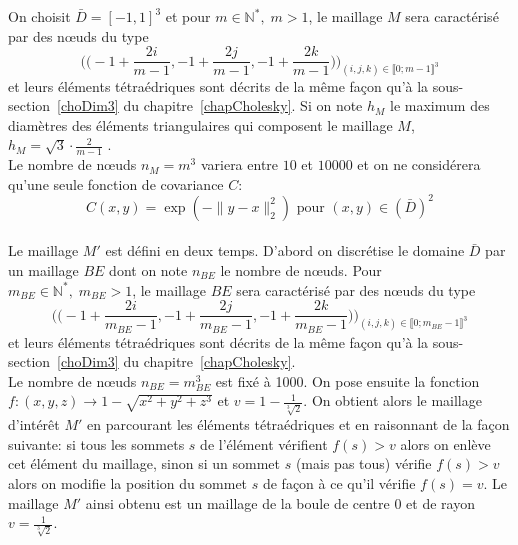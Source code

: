 On choisit $\bar{D}= [-1,1]^3$ et pour $m \in \mathbb{N}^{*}, \; m > 1$, le maillage $M$ sera caractérisé par des n\oe uds du type
\begin{equation*} \biggl (\biggl(-1 + \frac{2i}{m-1}, -1 + \frac{2j}{m-1}, -1 + \frac{2k}{m-1}\biggr)\biggr)_{(i,j,k) \in \llbracket 0;m-1 \rrbracket^3}  \end{equation*}
et leurs éléments tétraédriques sont décrits de la même façon qu'à la sous-section~\ref{choDim3} du chapitre~\ref{chapCholesky}.
Si on note $h_M$ le maximum des diamètres des éléments triangulaires qui composent le maillage $M$, $h_M = \sqrt{3} \cdot \frac{2}{m-1}$ .\\
Le nombre de n\oe uds $n_M = m^3$ variera entre $10$ et $10000$ et on ne considérera qu'une seule fonction de covariance $C$:
\begin{equation*} C(x,y) = \exp(-\|y-x\|_2^2)  \text{ pour } (x,y) \in (\bar{D})^2 \end{equation*}
~\\
Le maillage $M'$ est défini en deux temps. D'abord on discrétise le domaine $\bar{D}$ par un maillage $BE$ dont on
note $n_{BE}$ le nombre de n\oe uds. Pour \\$m_{BE} \in \mathbb{N}^{*}, \; m_{BE} > 1$, le maillage $BE$ sera caractérisé par des n\oe uds du type
\begin{equation*} \biggl (\biggl(-1 + \frac{2i}{m_{BE}-1}, -1 + \frac{2j}{m_{BE}-1}, -1 + \frac{2k}{m_{BE}-1}\biggr )\biggr)_{(i,j,k) \in \llbracket 0;m_{BE}-1 \rrbracket^3}  \end{equation*}
et leurs éléments tétraédriques sont décrits de la même façon qu'à la sous-section~\ref{choDim3} du chapitre~\ref{chapCholesky}.\\
Le nombre de n\oe uds $n_{BE} = m_{BE}^3$ est fixé à 1000.
On pose ensuite la fonction $f: (x,y,z)  \rightarrow 1 - \sqrt{x^2 + y^2 + z^3}$ et $v=1 - \frac{1}{\sqrt[3]{2}}$.
On obtient alors le maillage d'intérêt $M'$ en parcourant les éléments tétraédriques et en raisonnant de la façon suivante: si tous les sommets $s$
de l'élément vérifient $f(s)> v$ alors on enlève cet élément du maillage, sinon
si un sommet $s$ (mais pas tous) vérifie  $f(s)> v$ alors on modifie la position
du sommet $s$ de façon à ce qu'il vérifie $f(s) = v$.
Le maillage $M'$ ainsi obtenu est un maillage de la boule de centre $0$ et de rayon $v=\frac{1}{\sqrt[3]{2}}$.\\
\phantom{oyez}\\

